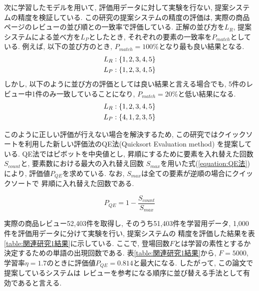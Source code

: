\documentclass{ltjarticle}
\begin{document}
次に学習したモデルを用いて, 評価用データに対して実験を行ない, 提案システムの精度を検証している. 
この研究の提案システムの精度の評価は, 実際の商品ページのレビューの並び順との一致率で評価している. 
正解の並び方を$L_R$, 提案システムによる並べ方を$L_P$としたとき, それぞれの要素の一致率を$P_{match}$としている. 
例えば, 以下の並び方のとき, $P_{match}=100\%$となり最も良い結果となる. 
\begin{align}
    L_R:\{1,2,3,4,5\}\notag\\
    L_P:\{1,2,3,4,5\}\notag
\end{align}
しかし, 以下のように並び方の評価としては良い結果と言える場合でも, 5件のレビュー中1件のみ一致していることになり, 
$P_{match}=20\%$と低い結果になる. 
\begin{align}
    L_R:\{1,2,3,4,5\}\notag\\
    L_P:\{4,1,2,3,5\}\notag
\end{align}

このように正しい評価が行えない場合を解決するため, この研究ではクイックソートを利用した新しい評価法のQE法(Quicksort Evaluation method)
を提案している. QE法ではピボットを中央値とし, 昇順にするために要素を入れ替えた回数$S_{count}$と, 要素数における最大の入れ替え回数
$S_{max}$を用いた式(\ref{equation:QE法})により, 評価値$P_{QE}$を求めている. なお, $S_{max}$は全ての要素が逆順の場合にクイックソートで
昇順に入れ替えた回数である. 
\vspace{5truept}

\begin{equation}
    P_{QE}=1-\dfrac{S_{count}}{S_{max}}
    \label{equation:QE法}
\end{equation}
\vspace{5truept}

実際の商品レビュー52,403件を取得し, そのうち51,403件を学習用データ, 1,000件を評価用データに分けて実験を行い, 提案システムの
精度を評価した結果を表\ref{table:関連研究1結果}に示している. 
ここで, 登場回数$F$とは学習の素性とするか決定するための単語の出現回数である. 
表\ref{table:関連研究1結果}から, $F=5000$, 学習率$\eta=1.7$のときに評価値$P_{QE}=0.814$と最大になる. したがって, この論文で提案しているシステムは
レビューを参考になる順序に並び替える手法として有効であると言える. 
\end{document}
